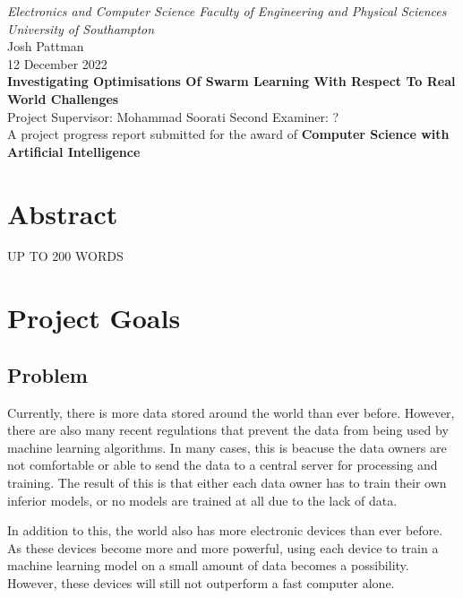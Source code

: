 \documentclass[12pt,a4paper,titlepage]{report}
\begin{document}
	\begin{titlepage}
		\centering\Large\emph{Electronics and Computer Science Faculty of Engineering and Physical Sciences University of Southampton}
		\\[3cm]
		\centering\Large{Josh Pattman} \\
		\centering\Large{12 December 2022} \\
		\centering\huge\textbf{Investigating Optimisations Of Swarm Learning With Respect To Real World Challenges}
		\\[4cm]
		\centering\Large{Project Supervisor: Mohammad Soorati}
		\centering\Large{Second Examiner: ?}
		\\[3cm]
		\centering\Large{A project progress report submitted for the award of \textbf{Computer Science with Artificial Intelligence}}
	\end{titlepage}


	\chapter*{Abstract}
	UP TO 200 WORDS

	\tableofcontents
	
	
	\chapter{Project Goals}
	\section{Problem}
	Currently, there is more data stored around the world than ever before. However, there are also many recent regulations that prevent the data from being used by machine learning algorithms. In many cases, this is beacuse the data owners are not comfortable or able to send the data to a central server for processing and training. The result of this is that either each data owner has to train their own inferior models, or no models are trained at all due to the lack of data.
	
	In addition to this, the world also has more electronic devices than ever before. As these devices become more and more powerful, using each device to train a machine learning model on a small amount of data becomes a possibility. However, these devices will still not outperform a fast computer alone.
	
\end{document}
